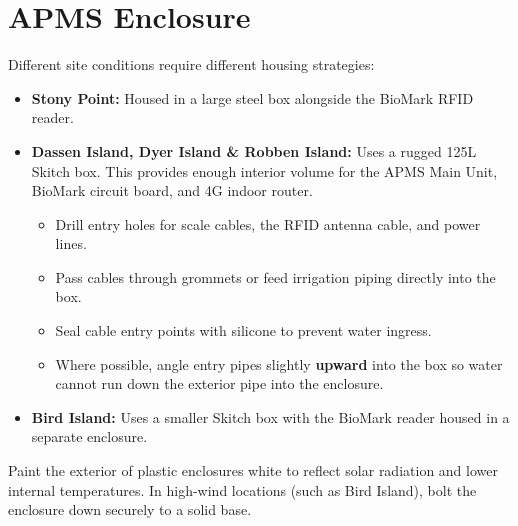 \documentclass[
  letterpaper,
]{scrbook}
\providecommand{\tightlist}{%
  \setlength{\itemsep}{0pt}\setlength{\parskip}{0pt}}
\begin{document}
\section{APMS Enclosure}\label{apms-enclosure}

Different site conditions require different housing strategies:

\begin{itemize}
\tightlist
\item
  \textbf{Stony Point:} Housed in a large steel box alongside the
  BioMark RFID reader.
\item
  \textbf{Dassen Island, Dyer Island \& Robben Island:} Uses a rugged
  125L Skitch box. This provides enough interior volume for the APMS
  Main Unit, BioMark circuit board, and 4G indoor router.

  \begin{itemize}
  \tightlist
  \item
    Drill entry holes for scale cables, the RFID antenna cable, and
    power lines.
  \item
    Pass cables through grommets or feed irrigation piping directly into
    the box.
  \item
    Seal cable entry points with silicone to prevent water ingress.
  \item
    Where possible, angle entry pipes slightly \textbf{upward} into the
    box so water cannot run down the exterior pipe into the enclosure.
  \end{itemize}
\item
  \textbf{Bird Island:} Uses a smaller Skitch box with the BioMark
  reader housed in a separate enclosure.
\end{itemize}

\begin{tcolorbox}[enhanced jigsaw, left=2mm, toptitle=1mm, breakable, opacitybacktitle=0.6, title=\textcolor{quarto-callout-tip-color}{\faLightbulb}\hspace{0.5em}{Enclosure Heat \& Mounting}, colback=white, opacityback=0, rightrule=.15mm, leftrule=.75mm, colbacktitle=quarto-callout-tip-color!10!white, bottomtitle=1mm, titlerule=0mm, coltitle=black, colframe=quarto-callout-tip-color-frame, arc=.35mm, bottomrule=.15mm, toprule=.15mm]

Paint the exterior of plastic enclosures white to reflect solar
radiation and lower internal temperatures. In high-wind locations (such
as Bird Island), bolt the enclosure down securely to a solid base.

\end{tcolorbox}
\end{document}
